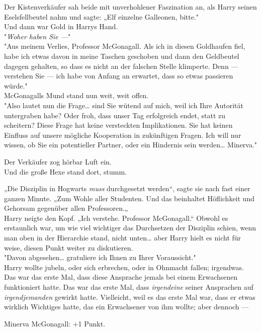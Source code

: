 {Der Kistenverkäufer sah beide mit unverhohlener Faszination an, als Harry seinen Eselsfellbeutel nahm und sagte: „Elf einzelne Galleonen, bitte."\\ Und dann war Gold in Harrys Hand.\\ "\emph{Woher haben Sie ---}"\\ "Aus meinem Verlies, Professor McGonagall. Als ich in diesen Goldhaufen fiel, habe ich etwas davon in meine Taschen geschoben und dann den Geldbeutel dagegen gehalten, so dass es nicht an der falschen Stelle klimperte. Denn --- verstehen Sie --- ich habe von Anfang an erwartet, dass so etwas passieren würde."\\ McGonagalls Mund stand nun weit, weit offen.\\ "Also lautet nun die Frage… sind Sie wütend auf mich, weil ich Ihre Autorität untergraben habe? Oder froh, dass unser Tag erfolgreich endet, statt zu scheitern? Diese Frage hat keine versteckten Implikationen. Sie hat keinen Einfluss auf unsere mögliche Kooperation in zukünftigen Fragen. Ich will nur wissen, ob Sie ein potentieller Partner, oder ein Hindernis sein werden… Minerva."

Der Verkäufer zog hörbar Luft ein.\\ Und die große Hexe stand dort, stumm.

„Die Disziplin in Hogwarts \emph{muss} durchgesetzt werden“, sagte sie nach fast einer ganzen Minute. „Zum Wohle aller Studenten. Und das beinhaltet Höflichkeit und Gehorsam gegenüber allen Professoren.„\\ Harry neigte den Kopf. „Ich verstehe. Professor McGonagall.“ Obwohl es erstaunlich war, um wie viel wichtiger das Durchsetzen der Disziplin schien, wenn man oben in der Hierarchie stand, nicht unten… aber Harry hielt es nicht für weise, diesen Punkt weiter zu diskutieren.\\ "Davon abgesehen… gratuliere ich Ihnen zu Ihrer Voraussicht."\\ Harry wollte jubeln, oder sich erbrechen, oder in Ohnmacht fallen; irgendwas. Das war das erste Mal, dass diese Ansprache jemals bei einem Erwachsenen funktioniert hatte. Das war das erste Mal, dass \emph{irgendeine} seiner Ansprachen auf \emph{irgendjemanden} gewirkt hatte. Vielleicht, weil es das erste Mal war, dass er etwas wirklich Wichtiges hatte, das ein Erwachsener von ihm wollte; aber dennoch ---

Minerva McGonagall: +1 Punkt.

}
